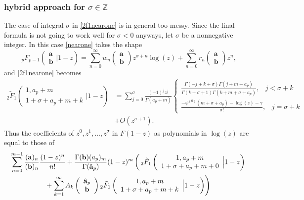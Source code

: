 \documentclass[10pt]{article}
\numberwithin{equation}{section}
\newcommand{\F}[5] {{}_{#1}F_{#2} \left( \begin{array}{c} #3 \\ #4 \end{array} \Big| #5  \right)}
\begin{document}
\subsubsection{hybrid approach for $\sigma \in \mathbb{Z}$}
The case of integral $\sigma$ in \eqref{2f1nearone} is in general too messy. Since the final formula is not going to work well for $\sigma < 0$ anyways, let $\sigma$ be a nonnegative integer. In this case \eqref{nearone} takes the shape
\begin{equation*}
\F{p}{p-1}{\mathbf{a}}{\mathbf{b}}{1-z} = \sum_{n=0}^{\infty} w_n \left(\begin{array}{c} \mathbf{a}\\\mathbf{b}\end{array} \right) z^{\sigma+n} \log(z) + \sum_{n=0}^{\infty} r_n \left(\begin{array}{c} \mathbf{a}\\\mathbf{b}\end{array} \right) z^n\text{,}
\end{equation*}
and \eqref{2f1nearone} becomes
\begin{equation*}
\begin{aligned}
{}_2\tilde{F}_1\left(\begin{array}{c} 1,a_p+m \\ 1+\sigma+a_p+m+k \end{array} \Big| 1-z\right) &= \sum_{j=0}^{\sigma} \frac{(-1)^j z^j}{\Gamma(a_p+m)} \begin{cases} \frac{\Gamma (-j+k+\sigma ) \Gamma
   \left(j+m+a_p\right)}{\Gamma (k+\sigma +1) \Gamma
   \left(k+m+\sigma +a_p\right)} \text{,} \quad j < \sigma + k \\
 \frac{-\psi ^{(0)}\left(m+\sigma+a_p\right)-\log(z)-\gamma }{\sigma !} \text{,} \quad j = \sigma+k \end{cases}\\
&+O(z^{\sigma+1})\text{.}
\end{aligned}
\end{equation*}
Thus the coefficients of $z^0,z^1,\dots,z^{\sigma}$ in $F(1-z)$ as polynomials in $\log(z)$ are equal to those of
\begin{equation*}
\begin{gathered}
\sum_{n=0}^{m-1}\frac{(\mathbf{a})_n}{(\mathbf{b})_n} \frac{(1-z)^n}{n!}+ \frac{\Gamma(\bold{b})(a_p)_m}{\Gamma(\hat{\bold{a}}_p)} (1-z)^m \left(\,{} _2\tilde{F}_1\left( \begin{array}{c} 1,a_p+m \\ 1+\sigma+a_p+m+0 \end{array} \Big| 1-z\right) \right.\\
+ \left. \sum_{k=1}^{\infty} {A_k\left(\begin{array}{c} \hat{\bold{a}}_p \\ \bold{b} \end{array}\right)} \,{} _2\tilde{F}_1\left( \begin{array}{c} 1,a_p+m \\ 1+\sigma+a_p+m+k \end{array} \Big| 1-z\right) \right)
\end{gathered}
\end{equation*}
\end{document}
